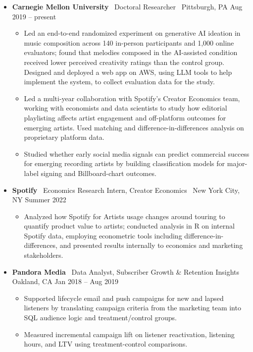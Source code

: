 \documentclass[10pt,letterpaper]{article}
\newcommand{\sep}{{\color{gray}\,\textbullet\,\,}}
\begin{document}
\begin{itemize}[leftmargin=0pt, label={}]
\item \textbf{Carnegie Mellon University} \sep Doctoral Researcher \sep Pittsburgh, PA \hfill Aug 2019 -- present
  \begin{itemize}
  \item Led an end-to-end randomized experiment on generative AI ideation in music composition across 140 in-person participants and 1{,}000 online evaluators; found that melodies composed in the AI-assisted condition received lower perceived creativity ratings than the control group. Designed and deployed a web app on AWS, using LLM tools to help implement the system, to collect evaluation data for the study.
  \item Led a multi-year collaboration with Spotify's Creator Economics team, working with economists and data scientists to study how editorial playlisting affects artist engagement and off-platform outcomes for emerging artists. Used matching and difference-in-differences analysis on proprietary platform data.
  \item Studied whether early social media signals can predict commercial success for emerging recording artists by building classification models for major-label signing and Billboard-chart outcomes.
  \end{itemize}
\item \textbf{Spotify} \sep Economics Research Intern, Creator Economics \sep New York City, NY \hfill Summer 2022
  \begin{itemize}
  \item Analyzed how Spotify for Artists usage changes around touring to quantify product value to artists; conducted analysis in R on internal Spotify data, employing econometric tools including difference-in-differences, and presented results internally to economics and marketing stakeholders.
  \end{itemize}
\item \textbf{Pandora Media} \sep Data Analyst, Subscriber Growth \& Retention Insights \sep Oakland, CA \hfill Jan 2018 -- Aug 2019
  \begin{itemize}
  \item Supported lifecycle email and push campaigns for new and lapsed listeners by translating campaign criteria from the marketing team into SQL audience logic and treatment/control groups.
  \item Measured incremental campaign lift on listener reactivation, listening hours, and LTV using treatment-control comparisons.

\end{itemize}
\end{itemize}
\end{document}
